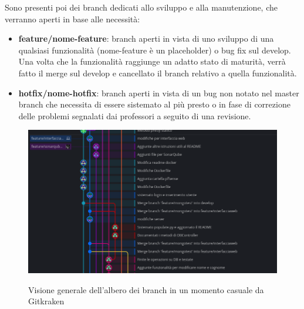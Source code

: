 		Sono presenti poi dei branch dedicati allo sviluppo e alla manutenzione, che verranno aperti in base alle necessità:
		\begin{itemize}
			\item \textbf{feature/nome-feature}: branch aperti in vista di uno sviluppo di una qualsiasi funzionalità (nome-feature è un placeholder) o bug fix sul develop.
				Una volta che la funzionalità raggiunge un adatto stato di maturità, verrà fatto il merge sul develop e cancellato il branch relativo a quella funzionalità.
			\item \textbf{hotfix/nome-hotfix}: branch aperti in vista di un bug non notato nel master branch che necessita di essere sistemato al più presto o in fase di
				correzione delle problemi segnalati dai professori a seguito di una revisione.
		\end{itemize}

		\begin{figure}[H]
			\centering
			\includegraphics[width=\textwidth]{img/branches.png}\\
			\caption[Albero dei branch da Gitkraken]{Visione generale dell'albero dei branch in un momento casuale da Gitkraken}
			\label{fig:butterfly}
		\end{figure}

